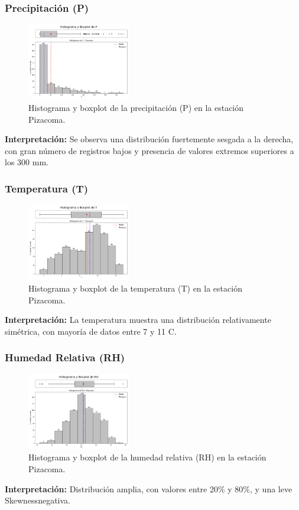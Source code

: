 \subsubsection*{Precipitación (P)}
\begin{figure}[H]
\centering
\includegraphics[width=0.4\textwidth]{resultados/por_estacion_meteorologica/Pizacoma/P_histograma.png}
\caption{Histograma y boxplot de la precipitación (P) en la estación Pizacoma.}
\label{fig:pizacoma_P}
\end{figure}
\textbf{Interpretación:} Se observa una distribución fuertemente sesgada a la derecha, con gran número de registros bajos y presencia de valores extremos superiores a los 300 mm.

\subsubsection*{Temperatura (T)}
\begin{figure}[H]
\centering
\includegraphics[width=0.4\textwidth]{resultados/por_estacion_meteorologica/Pizacoma/T_histograma.png}
\caption{Histograma y boxplot de la temperatura (T) en la estación Pizacoma.}
\label{fig:pizacoma_T}
\end{figure}
\textbf{Interpretación:} La temperatura muestra una distribución relativamente simétrica, con mayoría de datos entre 7 y 11 \textdegree C.

\subsubsection*{Humedad Relativa (RH)}
\begin{figure}[H]
\centering
\includegraphics[width=0.4\textwidth]{resultados/por_estacion_meteorologica/Pizacoma/RH_histograma.png}
\caption{Histograma y boxplot de la humedad relativa (RH) en la estación Pizacoma.}
\label{fig:pizacoma_RH}
\end{figure}
\textbf{Interpretación:} Distribución amplia, con valores entre 20\% y 80\%, y una leve Skewnessnegativa.

